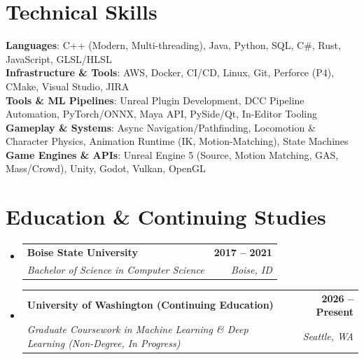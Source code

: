 \documentclass[letterpaper,11pt]{article}
\makeatletter
\newcommand{\resumeSubheading}[4]{
  \vspace{-2pt}\item
    \begin{tabular*}{1.0\textwidth}[t]{l@{\extracolsep{\fill}}r}
      \textbf{#1} & \textbf{\small #2} \\
      \textit{\small#3} & \textit{\small #4} \\
    \end{tabular*}\vspace{-7pt}
}
\newcommand{\resumeSubHeadingListStart}{\begin{itemize}[leftmargin=0.0in, label={}]}
\newcommand{\resumeSubHeadingListEnd}{\end{itemize}}
\makeatother
\begin{document}
\section{Technical Skills}
 \begin{itemize}[leftmargin=0.15in, label={}]
    \small{\item{
     \textbf{Languages}{: C++ (Modern, Multi-threading), Java, Python, SQL, C\#, Rust, JavaScript, GLSL/HLSL} \\
     \textbf{Infrastructure \& Tools}{: AWS, Docker, CI/CD, Linux, Git, Perforce (P4), CMake, Visual Studio, JIRA} \\
     \textbf{Tools \& ML Pipelines}{: Unreal Plugin Development, DCC Pipeline Automation, PyTorch/ONNX, Maya API, PySide/Qt, In-Editor Tooling} \\
     \textbf{Gameplay \& Systems}{: Async Navigation/Pathfinding, Locomotion \& Character Physics, Animation Runtime (IK, Motion-Matching), State Machines} \\
     \textbf{Game Engines \& APIs}{: Unreal Engine 5 (Source, Motion Matching, GAS, Mass/Crowd), Unity, Godot, Vulkan, OpenGL}
    }}
 \end{itemize}
 \vspace{-12pt}

\section{Education \& Continuing Studies}
  \resumeSubHeadingListStart
    \resumeSubheading
      {Boise State University}{2017 -- 2021}
      {Bachelor of Science in Computer Science}{Boise, ID}
    \resumeSubheading
      {University of Washington (Continuing Education)}{2026 -- Present}
      {Graduate Coursework in Machine Learning \& Deep Learning (Non-Degree, In Progress)}{Seattle, WA}
  \resumeSubHeadingListEnd
\end{document}
